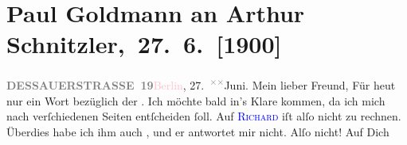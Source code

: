 

         
         \renewcommand{\erwaehntePersonen}{Personen: Richard Beer-Hofmann, Robert Hirschfeld, Leo Van-Jung}
         \renewcommand{\erwaehnteInstitutionen}{Institutionen: Houghton Library}
         \renewcommand{\erwaehnteOrte}{Orte: Alpen, Altaussee, Berlin, Dessauer Straße, Salzburg, Sekirn, Südtirol}
         \renewcommand{\erwaehnteWerke}{Werke: Tagebuch}
               \section[ Paul Goldmann an Arthur Schnitzler, 27. 6. {[}1900{]}]{Paul Goldmann an Arthur Schnitzler, 27. 6. {[}1900{]}}\nopagebreak{}\rehead{ }\normalsize\beginnumbering{} \toendnotes[C]{\smallbreak\pagebreak[2]} 
\toendnotes[C]{\smallbreak}\pstart
           \noindent{}{\pb}\textcolor{pink}{\textcolor{gray}{\textbf{DESSAUERSTRASSE 19}}}{}\ledrightnote{\textcolor{pink}{Dessauer Straße}}\hfill \textcolor{pink}{Berlin}{}\ledrightnote{\textcolor{pink}{Berlin}}, 27. \substVorne{}\textsuperscript{\textcolor{gray}{×}\-\textcolor{gray}{×}}\substDazwischen{}Ju\substHinten{}ni.\pend
           \pstart\center{}Mein lieber Freund,\pend\pstart
           Für heut nur ein Wort bezüglich der \label{K_L02922-2v}\label{K_L02922-2h}. Ich möchte bald in’s Klare kommen, da ich mich nach verſchiedenen Seiten
               entſcheiden ſoll. Auf \textsc{\textcolor{blue}{Richard}{}\ledrightnote{\textcolor{blue}{Richard Beer-Hofmann}}} iſt alſo nicht zu rechnen. Überdies habe ich \strikeout{\textcolor{gray}{an}} ihm auch \label{K_L02922-1v}\label{K_L02922-1h}, und er antwortet mir nicht. Alſo nicht! Auf Dich
